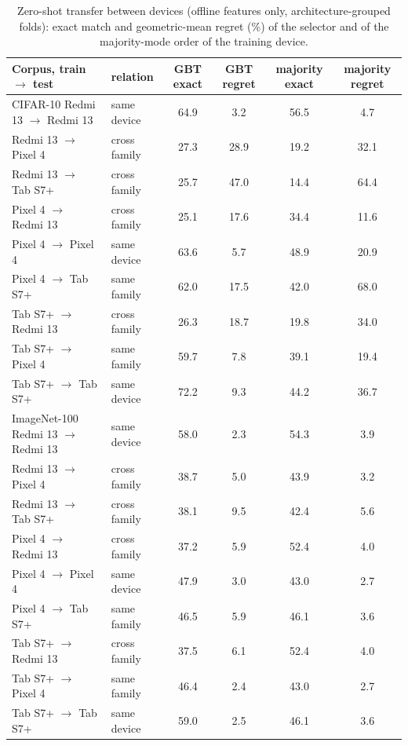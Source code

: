 \begin{table}[!t]
\centering
\caption{Zero-shot transfer between devices (offline features only, architecture-grouped folds): exact match and geometric-mean regret (\%) of the selector and of the majority-mode order of the training device.}
\label{tab:transfer_full}
\footnotesize
\setlength{\tabcolsep}{2.5pt}
\begin{tabular}{@{}llcccc@{}}
\toprule
\textbf{Corpus, train $\to$ test} & relation & GBT exact & GBT regret & majority exact & majority regret \\
\midrule
CIFAR-10 Redmi 13 $\to$ Redmi 13 & same device & 64.9 & 3.2 & 56.5 & 4.7 \\
 Redmi 13 $\to$ Pixel 4 & cross family & 27.3 & 28.9 & 19.2 & 32.1 \\
 Redmi 13 $\to$ Tab S7+ & cross family & 25.7 & 47.0 & 14.4 & 64.4 \\
 Pixel 4 $\to$ Redmi 13 & cross family & 25.1 & 17.6 & 34.4 & 11.6 \\
 Pixel 4 $\to$ Pixel 4 & same device & 63.6 & 5.7 & 48.9 & 20.9 \\
 Pixel 4 $\to$ Tab S7+ & same family & 62.0 & 17.5 & 42.0 & 68.0 \\
 Tab S7+ $\to$ Redmi 13 & cross family & 26.3 & 18.7 & 19.8 & 34.0 \\
 Tab S7+ $\to$ Pixel 4 & same family & 59.7 & 7.8 & 39.1 & 19.4 \\
 Tab S7+ $\to$ Tab S7+ & same device & 72.2 & 9.3 & 44.2 & 36.7 \\
\midrule
ImageNet-100 Redmi 13 $\to$ Redmi 13 & same device & 58.0 & 2.3 & 54.3 & 3.9 \\
 Redmi 13 $\to$ Pixel 4 & cross family & 38.7 & 5.0 & 43.9 & 3.2 \\
 Redmi 13 $\to$ Tab S7+ & cross family & 38.1 & 9.5 & 42.4 & 5.6 \\
 Pixel 4 $\to$ Redmi 13 & cross family & 37.2 & 5.9 & 52.4 & 4.0 \\
 Pixel 4 $\to$ Pixel 4 & same device & 47.9 & 3.0 & 43.0 & 2.7 \\
 Pixel 4 $\to$ Tab S7+ & same family & 46.5 & 5.9 & 46.1 & 3.6 \\
 Tab S7+ $\to$ Redmi 13 & cross family & 37.5 & 6.1 & 52.4 & 4.0 \\
 Tab S7+ $\to$ Pixel 4 & same family & 46.4 & 2.4 & 43.0 & 2.7 \\
 Tab S7+ $\to$ Tab S7+ & same device & 59.0 & 2.5 & 46.1 & 3.6 \\
\bottomrule
\end{tabular}
\end{table}


